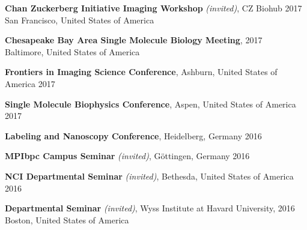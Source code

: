 \documentclass[margin,line]{res}
\begin{document}
\begin{resume}
\vspace*{-2.5mm}
{\bf Chan Zuckerberg Initiative Imaging Workshop} {\it (invited)}, CZ Biohub \hfill 2017\\
 San Francisco, United States of America%

\vspace*{-2.5mm}
{\bf Chesapeake Bay Area Single Molecule Biology Meeting},  \hfill 2017\\
Baltimore, United States of America%

\vspace*{-2.5mm}
{\bf Frontiers in Imaging Science Conference}, Ashburn, United States of America \hfill 2017%

\vspace*{-2.5mm}
{\bf Single Molecule Biophysics Conference}, Aspen, United States of America \hfill 2017%

\vspace*{-2.5mm}
{\bf Labeling and Nanoscopy Conference}, Heidelberg, Germany \hfill 2016%

\vspace*{-2.5mm}
{\bf MPIbpc Campus Seminar} {\it (invited)}, Göttingen, Germany \hfill 2016%

\vspace*{-2.5mm}
{\bf NCI Departmental Seminar} {\it (invited)}, Bethesda, United States of America \hfill 2016%

\vspace*{-2.5mm}
{\bf Departmental Seminar} {\it (invited)}, Wyss Institute at Havard University,  \hfill 2016\\
Boston, United States of America


\end{resume}
\end{document}
